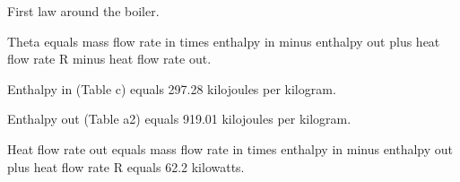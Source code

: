 First law around the boiler.

Theta equals mass flow rate in times enthalpy in minus enthalpy out plus heat flow rate R minus heat flow rate out.

Enthalpy in (Table c) equals 297.28 kilojoules per kilogram.

Enthalpy out (Table a2) equals 919.01 kilojoules per kilogram.

Heat flow rate out equals mass flow rate in times enthalpy in minus enthalpy out plus heat flow rate R equals 62.2 kilowatts.